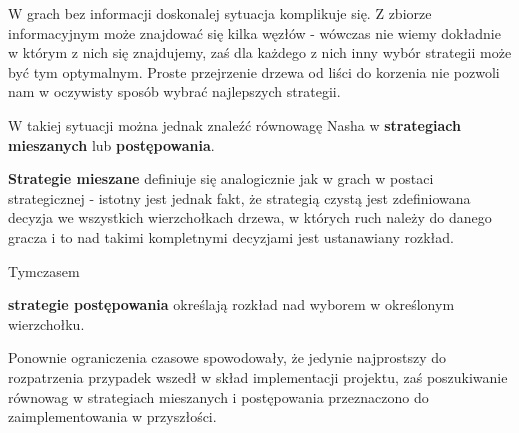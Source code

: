\documentclass[polish]{standalone}
\begin{document}
W grach bez informacji doskonalej sytuacja komplikuje się. Z zbiorze informacyjnym może znajdować się kilka węzłów -
wówczas nie wiemy dokładnie w którym z nich się znajdujemy, zaś dla każdego z nich inny wybór strategii może być tym
optymalnym. Proste przejrzenie drzewa od liści do korzenia nie pozwoli nam w oczywisty sposób wybrać najlepszych
strategii.

W takiej sytuacji można jednak znaleźć równowagę Nasha w \textbf{strategiach mieszanych} lub \textbf{postępowania}.

\begin{definition}
\textbf{Strategie mieszane} definiuje się analogicznie jak w grach w postaci strategicznej - istotny jest jednak fakt,
że strategią czystą jest zdefiniowana decyzja we wszystkich wierzchołkach drzewa, w których ruch należy do danego gracza
i to nad takimi kompletnymi decyzjami jest ustanawiany rozkład.
\end{definition}

Tymczasem
\begin{definition}
\textbf{strategie postępowania} określają rozkład nad wyborem w określonym wierzchołku.
\end{definition}

Ponownie ograniczenia czasowe spowodowały, że jedynie najprostszy do rozpatrzenia przypadek wszedł w skład implementacji
projektu, zaś poszukiwanie równowag w strategiach mieszanych i postępowania przeznaczono do zaimplementowania
w przyszłości.
\end{document}
